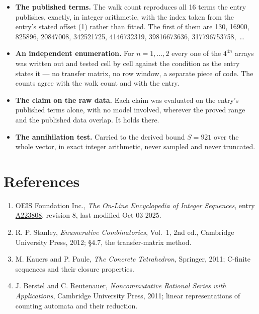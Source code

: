 \documentclass[11pt]{article}
\theoremstyle{definition}
\begin{document}
\begin{itemize}

\item {\bfseries The published terms.} The walk count reproduces all 16 terms the entry publishes, exactly, in integer arithmetic, with the index taken from the entry's stated offset (1) rather than fitted. The first of them are 130, 16900, 825896, 20847008, 342521725, 4146732319, 39816673636, 317796753758,~\dots

\item {\bfseries An independent enumeration.} For $n = 1,\dots,2$ every one of the $4^{4n}$ arrays was written out and tested cell by cell against the condition as the entry states it --- no transfer matrix, no row window, a separate piece of code. The counts agree with the walk count and with the entry.

\item {\bfseries The claim on the raw data.} Each claim was evaluated on the entry's published terms alone, with no model involved, wherever the proved range and the published data overlap. It holds there.

\item {\bfseries The annihilation test.} Carried to the derived bound $S = 921$ over the whole vector, in exact integer arithmetic, never sampled and never truncated.

\end{itemize}

\section{References}

\begin{enumerate}

\item OEIS Foundation Inc., \emph{The On-Line Encyclopedia of Integer Sequences}, entry \href{https://oeis.org/A223808}{A223808}, revision 8, last modified Oct 03 2025.

\item R. P. Stanley, \emph{Enumerative Combinatorics}, Vol.~1, 2nd ed., Cambridge University Press, 2012; \S4.7, the transfer-matrix method.

\item M. Kauers and P. Paule, \emph{The Concrete Tetrahedron}, Springer, 2011; C-finite sequences and their closure properties.

\item J. Berstel and C. Reutenauer, \emph{Noncommutative Rational Series with Applications}, Cambridge University Press, 2011; linear representations of counting automata and their reduction.

\end{enumerate}
\end{document}
